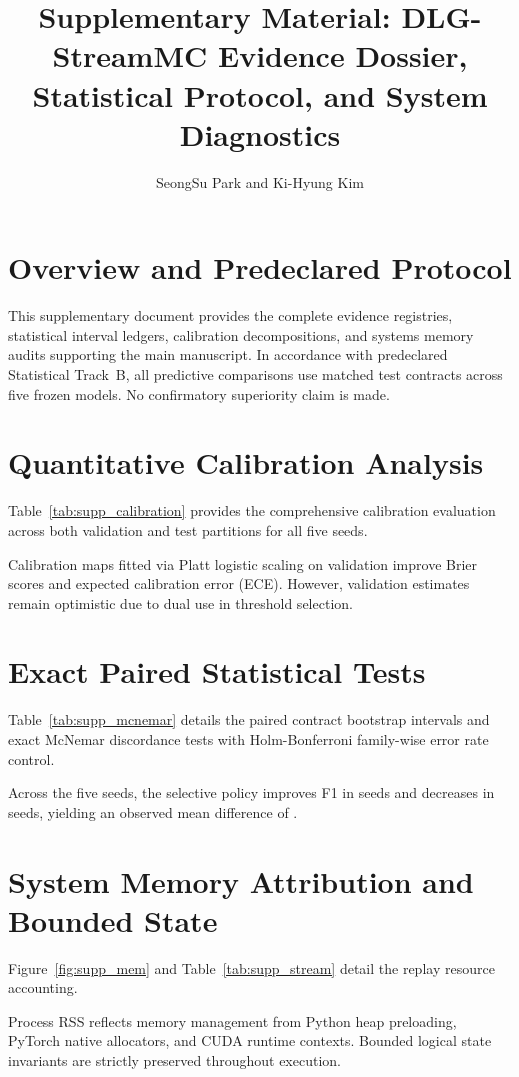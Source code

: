 \documentclass[10pt,journal]{IEEEtran}
\title{Supplementary Material: DLG-StreamMC Evidence Dossier, Statistical Protocol, and System Diagnostics}
\author{SeongSu Park and Ki-Hyung Kim}
\begin{document}
\maketitle

\section{Overview and Predeclared Protocol}
This supplementary document provides the complete evidence registries, statistical interval ledgers, calibration decompositions, and systems memory audits supporting the main manuscript.
In accordance with predeclared Statistical Track~B, all predictive comparisons use matched test contracts across five frozen models. No confirmatory superiority claim is made.

\section{Quantitative Calibration Analysis}
Table~\ref{tab:supp_calibration} provides the comprehensive calibration evaluation across both validation and test partitions for all five seeds.

Calibration maps fitted via Platt logistic scaling on validation improve Brier scores and expected calibration error (ECE). However, validation estimates remain optimistic due to dual use in threshold selection.

\section{Exact Paired Statistical Tests}
Table~\ref{tab:supp_mcnemar} details the paired contract bootstrap intervals and exact McNemar discordance tests with Holm-Bonferroni family-wise error rate control.

Across the five seeds, the selective policy improves F1 in \PositiveSeeds{} seeds and decreases in \NegativeSeeds{} seeds, yielding an observed mean difference of \DeltaFOne{}.

\section{System Memory Attribution and Bounded State}
Figure~\ref{fig:supp_mem} and Table~\ref{tab:supp_stream} detail the replay resource accounting.

Process RSS reflects memory management from Python heap preloading, PyTorch native allocators, and CUDA runtime contexts. Bounded logical state invariants are strictly preserved throughout execution.
\end{document}
